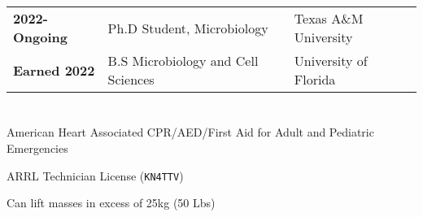 \documentclass[11pt]{article}
\begin{document}
\section*{\color{secondary}{Academics}}
	\begin{longtable}{lp{}p{}}
		\textbf{2022-Ongoing} & Ph.D Student, Microbiology & Texas A\&M University \\
		\textbf{Earned 2022} & B.S Microbiology and Cell Sciences & University
                        of Florida \\ 
        \end{longtable}

\section*{\color{secondary}{General Skills}}
       \begin{description}[noitemsep]
		        \item{American Heart Associated CPR/AED/First Aid for Adult and
        			Pediatric Emergencies}
                \item{ARRL Technician License (\texttt{KN4TTV})}
        		\item{Can lift masses in excess of 25kg (50 Lbs)}
        \end{description}
\end{document}
